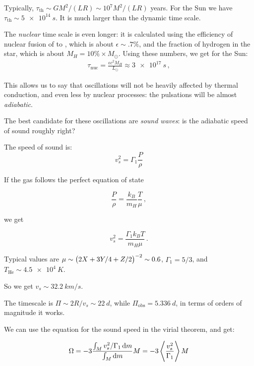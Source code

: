\documentclass[main.tex]{subfiles}
\begin{document}
Typically, \(\tau_{\text{th}} \sim G M^2 /(LR) \sim 10^7 M^2/(LR) \) years.  
For the Sun we have \(\tau_{\text{th}} \sim \SI{5e14}{s}\). 
It is much larger than the dynamic time scale.

The \emph{nuclear} time scale is even longer: it is calculated using the efficiency of nuclear fusion of  to , which is about \(\epsilon \sim \num{.7} \% \), and the fraction of hydrogen in the star, which is about \(M_H = \num{10} \% \times M_{\odot} \). Using these numbers, we get for the Sun:
%
\begin{align}
\tau_{\text{nuc}} = \frac{\epsilon c^2  M_H}{L_{\odot}} \approx \SI{3e17}{s}
\,,
\end{align}
%


This allows us to say that oscillations will not be heavily affected by thermal conduction, and even less by nuclear processes: the pulsations will be almost \emph{adiabatic}.

The best candidate for these oscillations are \emph{sound waves}: is the adiabatic speed of sound roughly right?

The speed of sound is:
%
\begin{equation}
  v_s^2 = \Gamma_1 \frac{P}{\rho}
\end{equation}

If the gas follows the perfect equation of state

\begin{equation}
  \frac{P}{\rho} = \frac{k_B}{m_H} \frac{T}{\mu}  \,,
\end{equation}

we get

\begin{equation}
  v_s^2 = \frac{\Gamma_1 k_B T}{m_H \mu}  \,.
\end{equation}

Typical values are \(\mu \sim \qty(2X + 3Y/4 + Z/2)^{-2} \sim 0.6\), \(\Gamma_1 = 5/3\), and \(T_{\text{He}} \sim \SI{4.5e4}{K} \).

So we get \(v_s \sim \SI{32.2}{km/s}\).

The timescale is \(\Pi \sim 2R/v_s \sim \SI{22}{d}\), while \(\Pi_{\text{obs}} = \SI{5.336}{d} \), in terms of orders of magnitude it works.

We can use the equation for the sound speed in the virial theorem, and get:

\begin{equation}
  \Omega = - 3 \frac{\int _{M}  v_s^2 / \Gamma_1 \dd{m}}{\int_M \dd{m}}M = -3 \expval{\frac{v_s^2}{\Gamma_1}} M
\end{equation}
\end{document}
